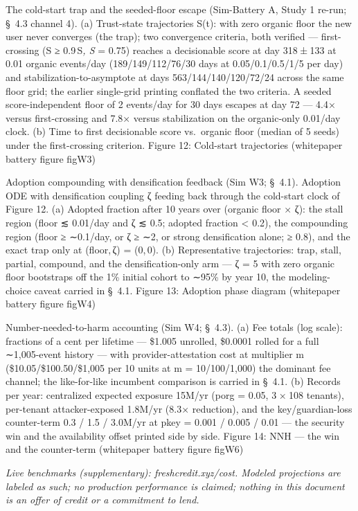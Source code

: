 \documentclass[
]{article}
\begin{document}
The cold-start trap and the seeded-floor escape (Sim-Battery A, Study 1
re-run; §~4.3 channel 4). (a) Trust-state trajectories S(t): with zero
organic floor the new user never converges (the trap); two convergence
criteria, both verified --- first-crossing ({S ≥ 0.9 S\emph{,
S} = 0.75}) reaches a decisionable score at day {318 ± 133} at 0.01
organic events/day (189/149/112/76/30 days at 0.05/0.1/0.5/1/5 per day)
and stabilization-to-asymptote at days 563/144/140/120/72/24 across the
same floor grid; the earlier single-grid printing conflated the two
criteria. A seeded score-independent floor of 2 events/day for 30 days
escapes at day 72 --- 4.4{×} versus first-crossing and 7.8{×} versus
stabilization on the organic-only 0.01/day clock. (b) Time to first
decisionable score vs.~organic floor (median of 5 seeds) under the
first-crossing criterion. Figure 12: Cold-start trajectories (whitepaper
battery figure figW3)

Adoption compounding with densification feedback (Sim W3; §~4.1).
Adoption ODE with densification coupling {ζ} feeding back through the
cold-start clock of Figure 12. (a) Adopted fraction after 10 years over
(organic floor {×} {ζ}): the stall region (floor {≲} 0.01/day and {ζ}
{≲} 0.5; adopted fraction {\textless{}} 0.2), the compounding region
(floor {≥} {∼}0.1/day, or {ζ} {≥} {∼}2, or strong densification alone;
{≥} 0.8), and the exact trap only at {(floor, ζ) = (0, 0)}. (b)
Representative trajectories: trap, stall, partial, compound, and the
densification-only arm --- {ζ} = 5 with zero organic floor bootstraps
off the 1\% initial cohort to {∼}95\% by year 10, the modeling-choice
caveat carried in §~4.1. Figure 13: Adoption phase diagram (whitepaper
battery figure figW4)

Number-needed-to-harm accounting (Sim W4; §~4.3). (a) Fee totals (log
scale): fractions of a cent per lifetime --- \$1.005 unrolled, \$0.0001
rolled for a full {∼}1,005-event history --- with provider-attestation
cost at multiplier m (\$10.05/\$100.50/\$1,005 per 10 units at m =
10/100/1,000) the dominant fee channel; the like-for-like incumbent
comparison is carried in §~4.1. (b) Records per year: centralized
expected exposure 15M/yr ({porg} = 0.05, {3 × 108} tenants), per-tenant
attacker-exposed 1.8M/yr (8.3{×} reduction), and the key/guardian-loss
counter-term 0.3 / 1.5 / 3.0M/yr at {pkey} = 0.001 / 0.005 / 0.01 ---
the security win and the availability offset printed side by side.
Figure 14: NNH --- the win and the counter-term (whitepaper battery
figure figW6)

\emph{Live benchmarks (supplementary): freshcredit.xyz/cost. Modeled
projections are labeled as such; no production performance is claimed;
nothing in this document is an offer of credit or a commitment to lend.}
\end{document}
